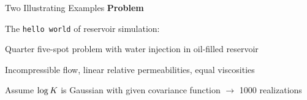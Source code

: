 \def\name{Two Illustrating Examples}

\begin{frame}{\name{}}
    \textbf{Problem}
    \begin{squarelist}
        \item The \texttt{hello world} of reservoir simulation:
        \begin{circlelist}
            \item Quarter five-spot problem with water injection in oil-filled reservoir
        \end{circlelist}
        \item Incompressible flow, linear relative permeabilities, equal viscosities
        \item Assume $\log K$ is Gaussian with given covariance function $\rightarrow$ 1000 realizations
    \end{squarelist}
\end{frame}

\def\name{Example 1: Smooth Permeability}

